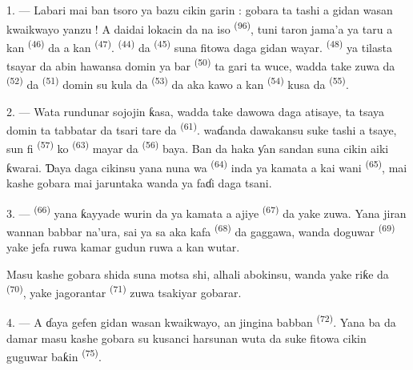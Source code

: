 \VUsaut{5.0mm}
\VUsaut{3.0mm}

\VUsaut{3.4mm}

1. --- Labari mai ban tsoro ya bazu cikin garin : gobara ta tashi a
gidan wasan kwaikwayo yanzu ! A daidai lokacin da na iso
 \textsuperscript{(96)}, tuni taron jama’a ya taru a kan
 \textsuperscript{(46)} da a kan 
\textsuperscript{(47)}. 
\textsuperscript{(44)} da  \textsuperscript{(45)} suna
fitowa daga gidan wayar.  \textsuperscript{(48)} ya
tilasta tsayar da abin hawansa domin ya bar 
\textsuperscript{(50)} ta gari ta wuce, wadda take zuwa da
 \textsuperscript{(52)} da 
\textsuperscript{(51)} domin su kula da 
\textsuperscript{(53)} da aka kawo a kan 
\textsuperscript{(54)} kusa da 
\textsuperscript{(55)}.

2. --- Wata rundunar sojojin ƙasa, wadda take dawowa daga atisaye, ta
tsaya domin ta tabbatar da tsari tare da  \textsuperscript{(61)}.  waɗanda dawakansu
suke tashi a tsaye, sun fi  \textsuperscript{(57)} ko
 \textsuperscript{(63)} mayar da 
\textsuperscript{(56)} baya. Ban da haka ƴan sandan suna cikin aiki
ƙwarai. Ɗaya daga cikinsu yana nuna wa 
\textsuperscript{(64)} inda ya kamata a kai wani  \textsuperscript{(65)}, mai kashe gobara mai jaruntaka wanda ya
faɗi daga tsani.

3. ---  \textsuperscript{(66)} yana ƙayyade wurin da ya
kamata a ajiye  \textsuperscript{(67)} da yake zuwa.
Yana jiran wannan babbar na’ura, sai ya sa aka kafa  \textsuperscript{(68)} da gaggawa, wanda doguwar
 \textsuperscript{(69)} yake jefa ruwa kamar gudun ruwa a
kan wutar.

Masu kashe gobara shida suna motsa shi, alhali abokinsu, wanda yake
riƙe da  \textsuperscript{(70)}, yake jagorantar
 \textsuperscript{(71)} zuwa tsakiyar gobarar.

4. --- A ɗaya gefen gidan wasan kwaikwayo, an jingina babban
 \textsuperscript{(72)}. Yana ba da damar masu kashe gobara su
kusanci harsunan wuta da suke fitowa cikin guguwar baƙin
 \textsuperscript{(75)}.

